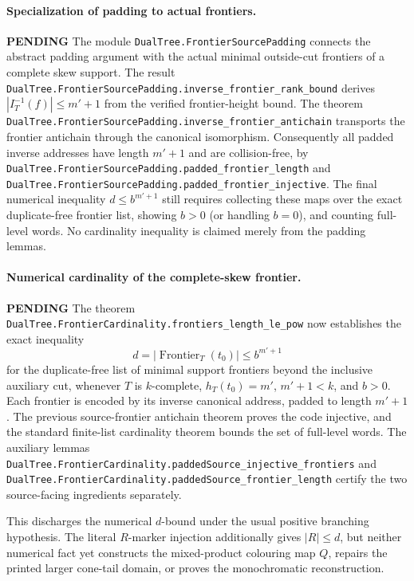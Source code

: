 \documentclass[11pt]{article}
\newcommand{\todo}{\textcolor{gray!70!black}{\textbf{PENDING}}}
\newcommand{\lean}[1]{\texttt{#1}}
\begin{document}
\paragraph{Specialization of padding to actual frontiers.} \todo
The module \lean{DualTree.FrontierSourcePadding} connects the abstract
padding argument with the actual minimal outside-cut frontiers of
a complete skew support.  The result
\lean{DualTree.FrontierSourcePadding.inverse_frontier_rank_bound}
derives $|I_T^{-1}(f)|\le m'+1$ from the verified frontier-height
bound.  The theorem
\lean{DualTree.FrontierSourcePadding.inverse_frontier_antichain}
transports the frontier antichain through the canonical isomorphism.
Consequently all padded inverse addresses have length $m'+1$
and are collision-free, by
\lean{DualTree.FrontierSourcePadding.padded_frontier_length}
and \lean{DualTree.FrontierSourcePadding.padded_frontier_injective}.
The final numerical inequality $d\le b^{m'+1}$ still requires
collecting these maps over the exact duplicate-free frontier list,
showing $b>0$ (or handling $b=0$), and counting full-level words.
No cardinality inequality is claimed merely from the padding lemmas.


\paragraph{Numerical cardinality of the complete-skew frontier.} \todo
The theorem \lean{DualTree.FrontierCardinality.frontiers_length_le_pow}
now establishes the exact inequality
\[
  d=|\operatorname{Frontier}_T(t_0)|\le b^{m'+1}
\]
for the duplicate-free list of minimal support frontiers beyond
the inclusive auxiliary cut, whenever $T$ is $k$-complete,
$h_T(t_0)=m'$, $m'+1<k$, and $b>0$.
Each frontier is encoded by its inverse canonical address,
padded to length $m'+1$. The previous source-frontier antichain
theorem proves the code injective, and the standard finite-list
cardinality theorem bounds the set of full-level words.
The auxiliary lemmas
\lean{DualTree.FrontierCardinality.paddedSource_injective_frontiers}
and \lean{DualTree.FrontierCardinality.paddedSource_frontier_length}
certify the two source-facing ingredients separately.

This discharges the numerical $d$-bound under the usual positive
branching hypothesis. The literal $R$-marker injection additionally
gives $|R|\le d$, but neither numerical fact yet constructs the
mixed-product colouring map $Q$, repairs the printed larger
cone-tail domain, or proves the monochromatic reconstruction.
\end{document}
